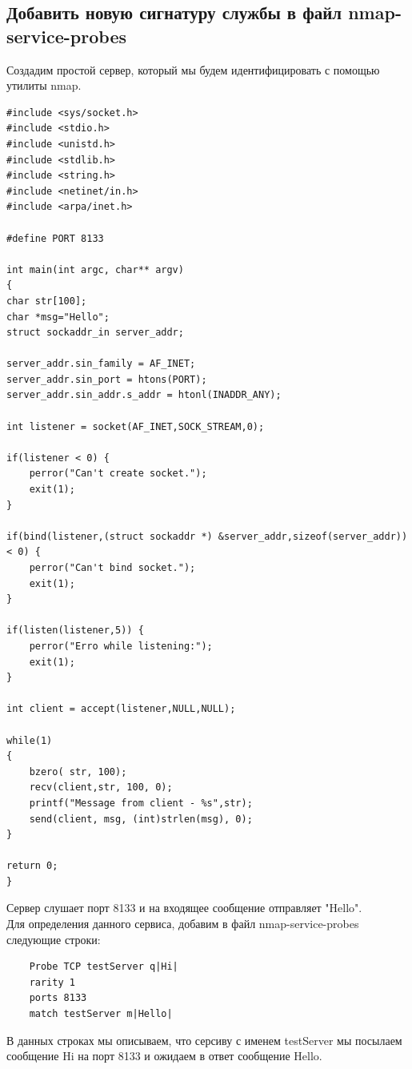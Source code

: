 \documentclass[10pt,a4paper,titlepage]{article}
\begin{document}
\subsection{Добавить новую сигнатуру службы в файл nmap-service-probes}
Создадим простой сервер, который мы будем идентифицировать с помощью утилиты nmap.
\begin{verbatim}
#include <sys/socket.h>
#include <stdio.h>
#include <unistd.h>
#include <stdlib.h>
#include <string.h>
#include <netinet/in.h>
#include <arpa/inet.h>

#define PORT 8133

int main(int argc, char** argv)
{
char str[100];
char *msg="Hello";
struct sockaddr_in server_addr;

server_addr.sin_family = AF_INET;
server_addr.sin_port = htons(PORT);
server_addr.sin_addr.s_addr = htonl(INADDR_ANY);

int listener = socket(AF_INET,SOCK_STREAM,0);

if(listener < 0) {
    perror("Can't create socket.");
    exit(1);
}

if(bind(listener,(struct sockaddr *) &server_addr,sizeof(server_addr)) < 0) {
    perror("Can't bind socket.");
    exit(1);
}

if(listen(listener,5)) {
    perror("Erro while listening:");
    exit(1);
}

int client = accept(listener,NULL,NULL);

while(1)
{
    bzero( str, 100);
    recv(client,str, 100, 0);
    printf("Message from client - %s",str);
    send(client, msg, (int)strlen(msg), 0);
}

return 0;
}
\end{verbatim}

Сервер слушает порт 8133 и на входящее сообщение отправляет "Hello".\\
		
Для определения данного сервиса, добавим в файл nmap-service-probes следующие строки:
\begin{verbatim}
	Probe TCP testServer q|Hi|
	rarity 1
	ports 8133
	match testServer m|Hello|
\end{verbatim}
		
В данных строках мы описываем, что серсиву с именем testServer мы посылаем сообщение Hi на порт 8133 и ожидаем в ответ сообщение Hello.\\
		
\end{document}
